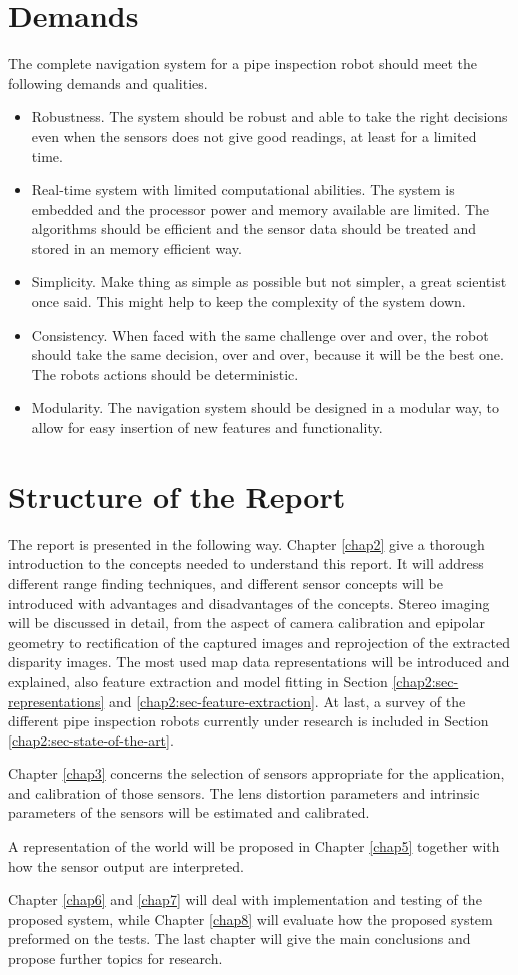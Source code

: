\section{Demands}
The complete navigation system for a pipe inspection robot should meet the following
demands and qualities. 
\begin{itemize}
    \item Robustness. The system should be robust and able to take the right decisions
    even when the sensors does not give good readings, at least for a limited time.
    \item Real-time system with limited computational abilities. The system is embedded
    and the processor power and memory available are limited. The algorithms should be
    efficient and the sensor data should be treated and stored in an memory efficient way. 
    \item Simplicity. Make thing as simple as possible but not simpler, a great scientist
    once said. This might help to keep the complexity of the system down. 
    \item Consistency. When faced with the same challenge over and over, the robot should
    take the same decision, over and over, because it will be the best one. The robots
    actions should be deterministic. 
    \item Modularity. The navigation system should be designed in a modular way, to allow
    for easy insertion of new features and functionality. 
\end{itemize}


\section{Structure of the Report}
The report is presented in the following way. Chapter \ref{chap2} give a thorough
introduction to the concepts needed to understand this report. It will address different
range finding techniques, and different sensor concepts will be introduced with advantages
and disadvantages of the concepts. Stereo imaging will be discussed in detail, from the
aspect of camera calibration and epipolar geometry to rectification of the captured images and
reprojection of the extracted disparity images. The most used map data representations will be
introduced and explained, also feature extraction and model fitting in Section
\ref{chap2:sec-representations} and \ref{chap2:sec-feature-extraction}. At last, a survey
of the different pipe inspection robots currently under research is included in Section
\ref{chap2:sec-state-of-the-art}.

Chapter \ref{chap3} concerns the selection of sensors appropriate for the application, and
calibration of those sensors. The lens distortion parameters and intrinsic parameters of the
sensors will be estimated and calibrated. 

A representation of the world will be proposed in Chapter \ref{chap5} together with how the sensor
output are interpreted.

Chapter \ref{chap6} and \ref{chap7} will deal with implementation and testing of the
proposed system, while Chapter \ref{chap8} will evaluate how the proposed system preformed
on the tests. The last chapter will give the main conclusions and propose further topics
for research. 
